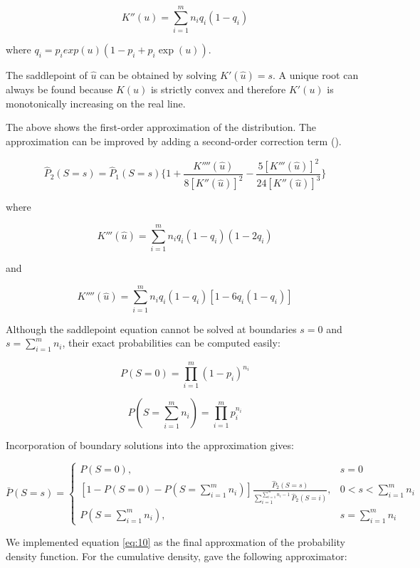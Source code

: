 \begin{equation}
K''(u) = \sum_{i=1}^m n_i q_i (1-q_i)
\end{equation}

where $q_i = p_i exp(u) (1-p_i + p_i \exp(u))$. 

The saddlepoint of $\hat{u}$ can be obtained by solving $K'(\hat{u})=s$. A unique root can always be found because $K(u)$ is strictly convex and therefore $K'(u)$ is monotonically increasing on the real line. 

The above shows the first-order approximation of the distribution. The approximation can be improved by adding a second-order correction term (\cite{Anonymous:0hq1uBaf}). 

\begin{equation}
\hat{P}_2(S=s)=\hat{P}_1(S=s)\Big\{1 + \frac{K''''(\hat{u})}{8[K''(\hat{u})]^2} - \frac{5[K'''(\hat{u})]^2}{24[K''(\hat{u})]^3}\Big\}
\end{equation}

where 

$$K'''(\hat{u}) = \sum_{i=1}^m n_i q_i (1-q_i) (1-2q_i)$$

and 

$$K''''(\hat{u}) = \sum_{i=1}^m n_i q_i (1-q_i) [1-6q_i(1-q_i)]$$

Although the saddlepoint equation cannot be solved at boundaries $s = 0$ and $s=\sum_{i=1}^m n_i$, their exact probabilities can be computed easily: 

\begin{equation}
P(S=0) = \prod_{i=1}^m (1-p_i)^{n_i}
\end{equation}

\begin{equation}
P(S=\sum_{i=1}^m n_i)=\prod_{i=1}^m p_i^{n_i}
\end{equation}

Incorporation of boundary solutions into the approximation gives: 

\begin{equation}
\bar{P}(S=s)=
\begin{cases}
P(S=0), & s=0 \\
[1-P(S=0)-P(S=\sum_{i=1}^m n_i)] \frac{\hat{P}_2(S=s)}{\sum_{i=1}^{\sum_{i=1}^m n_i-1} \hat{P}_2(S=i)}, & 0 < s < \sum_{i=1}^m n_i \\
P(S=\sum_{i=1}^m n_i), & s=\sum_{i=1}^m n_i 
\end{cases}
\label{eq:10}
\end{equation}

We implemented equation \ref{eq:10} as the final approxmation of the probability density function. For the cumulative density, \cite{Anonymous:0hq1uBaf} gave the following approximator: 

